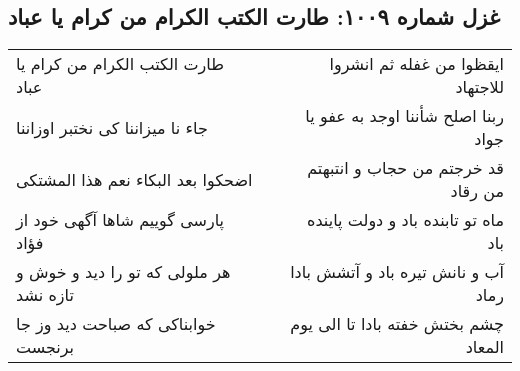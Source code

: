 \begin{center}
\section*{غزل شماره ۱۰۰۹: طارت الکتب الکرام من کرام یا عباد}
\label{sec:1009}
\begin{longtable}{l p{0.5cm} r}
طارت الکتب الکرام من کرام یا عباد
&&
ایقظوا من غفله ثم انشروا للاجتهاد
\\
جاء نا میزاننا کی نختبر اوزاننا
&&
ربنا اصلح شأننا اوجد به عفو یا جواد
\\
اضحکوا بعد البکاء نعم هذا المشتکی
&&
قد خرجتم من حجاب و انتبهتم من رقاد
\\
پارسی گوییم شاها آگهی خود از فؤاد
&&
ماه تو تابنده باد و دولت پاینده باد
\\
هر ملولی که تو را دید و خوش و تازه نشد
&&
آب و نانش تیره باد و آتشش بادا رماد
\\
خوابناکی که صباحت دید وز جا برنجست
&&
چشم بختش خفته بادا تا الی یوم المعاد
\\
\end{longtable}
\end{center}
